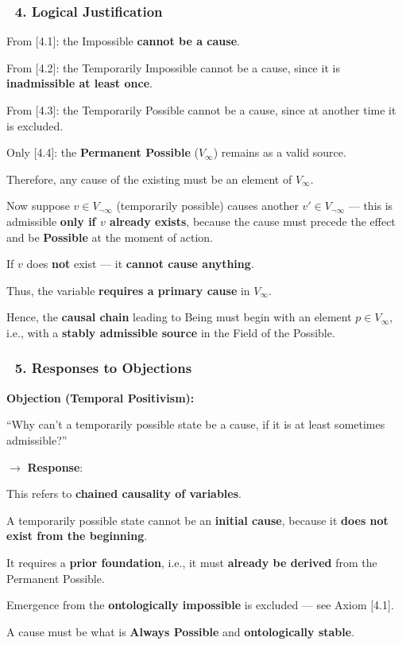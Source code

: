 \documentclass[12pt]{article}
\begin{document}
\subsubsection*{🔹 4. Logical Justification}
From [4.1]: the Impossible \textbf{cannot be a cause}.

From [4.2]: the Temporarily Impossible cannot be a cause, since it is \textbf{inadmissible at least once}.

From [4.3]: the Temporarily Possible cannot be a cause, since at another time it is excluded.

Only [4.4]: the \textbf{Permanent Possible} ($V_\infty$) remains as a valid source.

Therefore, any cause of the existing must be an element of $V_\infty$.

\bigskip
Now suppose $v \in V_{\neg\infty}$ (temporarily possible) causes another $v' \in V_{\neg\infty}$ — this is admissible \textbf{only if $v$ already exists}, because the cause must precede the effect and be \textbf{Possible} at the moment of action.

If $v$ does \textbf{not} exist — it \textbf{cannot cause anything}.

Thus, the variable \textbf{requires a primary cause} in $V_\infty$.

Hence, the \textbf{causal chain} leading to Being must begin with an element $p \in V_\infty$, i.e., with a \textbf{stably admissible source} in the Field of the Possible.

\subsubsection*{🔹 5. Responses to Objections}
\textbf{Objection (Temporal Positivism):}

``Why can’t a temporarily possible state be a cause, if it is at least sometimes admissible?''

$\rightarrow$ \textbf{Response}:

This refers to \textbf{chained causality of variables}.

A temporarily possible state cannot be an \textbf{initial cause}, because it \textbf{does not exist from the beginning}.

It requires a \textbf{prior foundation}, i.e., it must \textbf{already be derived} from the Permanent Possible.

Emergence from the \textbf{ontologically impossible} is excluded — see Axiom [4.1].

A cause must be what is \textbf{Always Possible} and \textbf{ontologically stable}.
\end{document}
